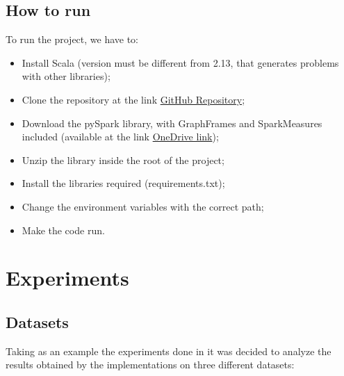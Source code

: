 \documentclass[a4paper,11pt, twoside]{article}
\begin{document}
        \subsection{How to run}
        To run the project, we have to:
        \begin{itemize}
            \item Install Scala (version must be different from 2.13, that generates problems with other libraries);
            \item Clone the repository at the link \href{https://github.com/ChiaraSolito/CountingTriangles.git}{GitHub Repository};
            \item Download the pySpark library, with GraphFrames and SparkMeasures included (available at the link \href{https://univr-my.sharepoint.com/:u:/g/personal/chiara_solito_studenti_univr_it/EdpZzBAhJsRJqaWQVC3sILoB1o_CA95KGCMpMGGmDUxioA?e=JUWd1Q}{OneDrive link});
            \item Unzip the library inside the root of the project;
            \item Install the libraries required (requirements.txt);
            \item Change the environment variables with the correct path;
            \item Make the code run.
        \end{itemize}
    	
    \newpage
    \section{Experiments}\label{experiments}
        \subsection{Datasets}
        Taking as an example the experiments done in \cite{Sharafeldeen2023} it was decided to analyze the results obtained by the implementations on three different datasets:
        
\end{document}
